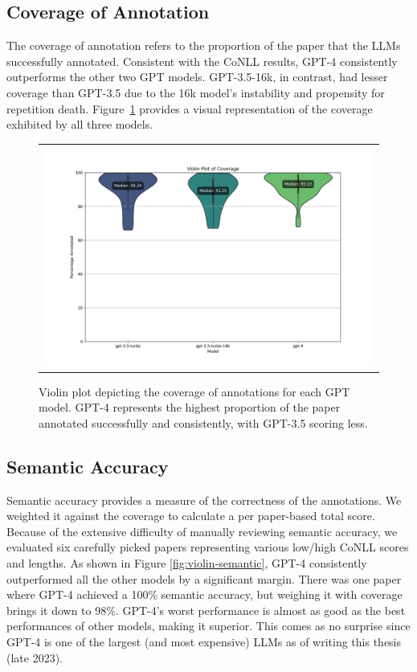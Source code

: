\subsection{Coverage of Annotation}

The coverage of annotation refers to the proportion of the paper that the LLMs successfully annotated. Consistent with the CoNLL results, GPT-4 consistently outperforms the other two GPT models. GPT-3.5-16k, in contrast, had lesser coverage than GPT-3.5 due to the 16k model's instability and propensity for repetition death. %
Figure~\ref{fig:violin-coverage} provides a visual representation of the coverage exhibited by all three models.

\begin{figure}[htpb]
  \centering
  \begin{tabular}{c}
  \includegraphics[width=14cm]{images/coverage.png}
  \end{tabular}
  \caption[Distribution of Coverage]{Violin plot depicting the coverage of annotations for each GPT model. GPT-4 represents the highest proportion of the paper annotated successfully and consistently, with GPT-3.5 scoring less.}\label{fig:violin-coverage}
\end{figure}
 
\subsection{Semantic Accuracy}
Semantic accuracy provides a measure of the correctness of the annotations. We weighted it against the coverage to calculate a per paper-based total score. Because of the extensive difficulty of manually reviewing semantic accuracy, we evaluated six carefully picked papers representing various low/high CoNLL scores and lengths. As shown in Figure \ref{fig:violin-semantic}, GPT-4 consistently outperformed all the other models by a significant margin. There was one paper where GPT-4 achieved a 100\% semantic accuracy, but weighing it with coverage brings it down to 98\%. GPT-4's worst performance is almost as good as the best performances of other models, making it superior. This comes as no surprise since GPT-4 is one of the largest (and most expensive) LLMs as of writing this thesis (late 2023).

